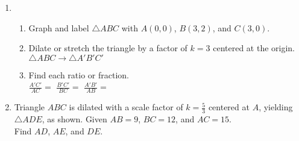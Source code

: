 \documentclass[12pt, twoside]{article}
\begin{document}
\begin{enumerate}[itemsep=0.5cm]
\item \begin{enumerate}
  \item Graph and label $\triangle ABC$ with $A(0,0)$, $B(3,2)$, and $C(3,0)$.
  \begin{center}
  \end{center}
  \item Dilate or stretch the triangle by a factor of $k=3$ centered at the origin.\\ $\triangle ABC \rightarrow \triangle A'B'C'$
  \item Find each ratio or fraction. \\[0.5cm]
    $\displaystyle \frac{A'C'}{AC}=$ \hfill
    $\displaystyle \frac{B'C'}{BC}=$ \hfill
    $\displaystyle \frac{A'B'}{AB}=$ \hspace{2cm}
\vspace{1cm}
\end{enumerate}

\item Triangle $ABC$ is dilated with a scale factor of $k=\frac{5}{3}$ centered at $A$, yielding $\triangle ADE$, as shown. Given $AB=9$, $BC=12$, and $AC=15$. \\[0.25cm] Find $AD$, $AE$, and $DE$. \vspace{0.5cm}
  \begin{flushleft}
  \end{flushleft}


\end{enumerate}
\end{document}
